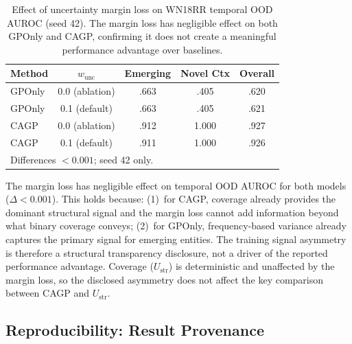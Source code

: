 \documentclass{article}
\begin{document}
\begin{table}[ht]
\centering
\caption{Effect of uncertainty margin loss on WN18RR temporal OOD AUROC (seed 42). The margin loss has negligible effect on both GPOnly and CAGP, confirming it does not create a meaningful performance advantage over baselines.}
\label{tab:margin_ablation}
\small
\begin{tabular}{lcccc}
\toprule
Method & $w_{\text{unc}}$ & Emerging & Novel Ctx & Overall \\
\midrule
GPOnly & 0.0 (ablation) & .663 & .405 & .620 \\
GPOnly & 0.1 (default) & .663 & .405 & .621 \\
\midrule
CAGP & 0.0 (ablation) & .912 & 1.000 & .927 \\
CAGP & 0.1 (default) & .911 & 1.000 & .926 \\
\bottomrule
\multicolumn{5}{l}{\scriptsize Differences $< 0.001$; seed 42 only.}
\end{tabular}
\end{table}

The margin loss has negligible effect on temporal OOD AUROC for both models ($\Delta < 0.001$). This holds because: (1)~for CAGP, coverage already provides the dominant structural signal and the margin loss cannot add information beyond what binary coverage conveys; (2)~for GPOnly, frequency-based variance already captures the primary signal for emerging entities. The training signal asymmetry is therefore a structural transparency disclosure, not a driver of the reported performance advantage. Coverage ($U_{\text{str}}$) is deterministic and unaffected by the margin loss, so the disclosed asymmetry does not affect the key comparison between CAGP and $U_{\text{str}}$.

\subsection{Reproducibility: Result Provenance}
\label{app:provenance}
\end{document}
